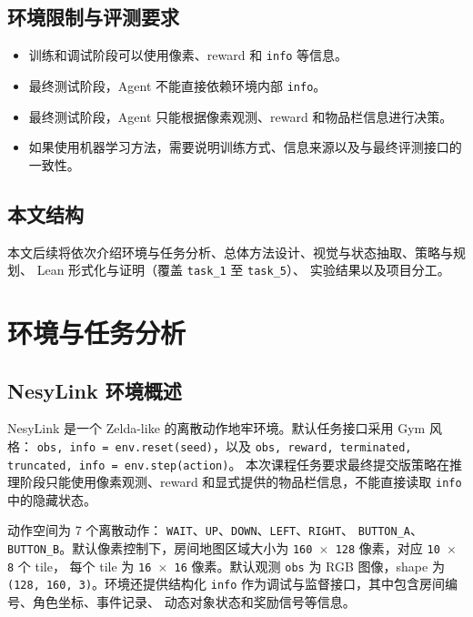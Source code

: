 \documentclass[12pt,a4paper]{ctexart}
\begin{document}
\subsection{环境限制与评测要求}

\begin{itemize}[leftmargin=2em]
  \item 训练和调试阶段可以使用像素、reward 和 \texttt{info} 等信息。
  \item 最终测试阶段，Agent 不能直接依赖环境内部 \texttt{info}。
  \item 最终测试阶段，Agent 只能根据像素观测、reward 和物品栏信息进行决策。
  \item 如果使用机器学习方法，需要说明训练方式、信息来源以及与最终评测接口的一致性。
\end{itemize}

\subsection{本文结构}

本文后续将依次介绍环境与任务分析、总体方法设计、视觉与状态抽取、策略与规划、
Lean 形式化与证明（覆盖 \texttt{task\_1} 至 \texttt{task\_5}）、
实验结果以及项目分工。

\section{环境与任务分析}

\subsection{NesyLink 环境概述}

NesyLink 是一个 Zelda-like 的离散动作地牢环境。默认任务接口采用 Gym 风格：
\texttt{obs, info = env.reset(seed)}，以及
\texttt{obs, reward, terminated, truncated, info = env.step(action)}。
本次课程任务要求最终提交版策略在推理阶段只能使用像素观测、reward
和显式提供的物品栏信息，不能直接读取 \texttt{info} 中的隐藏状态。

动作空间为 7 个离散动作：
\texttt{WAIT}、\texttt{UP}、\texttt{DOWN}、\texttt{LEFT}、\texttt{RIGHT}、
\texttt{BUTTON\_A}、\texttt{BUTTON\_B}。默认像素控制下，房间地图区域大小为
\texttt{160 \(\times\) 128} 像素，对应 \texttt{10 \(\times\) 8} 个 tile，
每个 tile 为 \texttt{16 \(\times\) 16} 像素。默认观测 \texttt{obs}
为 RGB 图像，shape 为 \texttt{(128, 160, 3)}。环境还提供结构化
\texttt{info} 作为调试与监督接口，其中包含房间编号、角色坐标、事件记录、
动态对象状态和奖励信号等信息。
\end{document}
